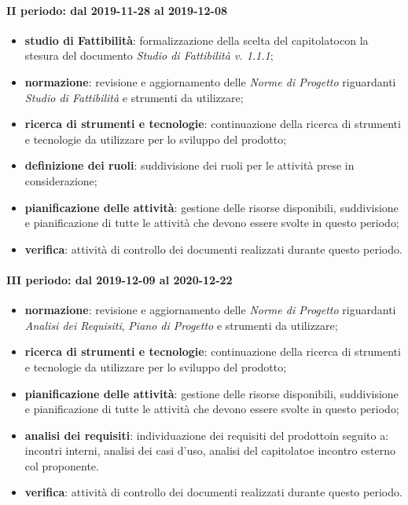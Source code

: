 \paragraph*{II periodo: dal 2019-11-28 al 2019-12-08}
\begin{itemize}
	\item \textbf{studio di Fattibilità}: formalizzazione della scelta del capitolato\glosp con la stesura del documento \textit{Studio di Fattibilità v. 1.1.1};
	\item \textbf{normazione}: revisione e aggiornamento delle \textit{Norme di Progetto} riguardanti \textit{Studio di Fattibilità} e strumenti da utilizzare;
	\item \textbf{ricerca di strumenti e tecnologie}: continuazione della ricerca di strumenti e tecnologie da utilizzare per lo sviluppo del prodotto\glo;
	\item \textbf{definizione dei ruoli}: suddivisione dei ruoli per le attività prese in considerazione; 
	\item \textbf{pianificazione delle attività}: gestione delle risorse disponibili, suddivisione e pianificazione di tutte le attività che devono essere svolte in questo periodo;
	\item \textbf{verifica}: attività di controllo dei documenti realizzati durante questo periodo.
\end{itemize}

\paragraph*{III periodo: dal 2019-12-09 al 2020-12-22}
\begin{itemize}
	\item \textbf{normazione}: revisione e aggiornamento delle \textit{Norme di Progetto} riguardanti \textit{Analisi dei Requisiti}, \textit{Piano di Progetto} e strumenti da utilizzare;
	\item \textbf{ricerca di strumenti e tecnologie}: continuazione della ricerca di strumenti e tecnologie da utilizzare per lo sviluppo del prodotto\glo;
	\item \textbf{pianificazione delle attività}: gestione delle risorse disponibili, suddivisione e pianificazione di tutte le attività che devono essere svolte in questo periodo;
	\item \textbf{analisi dei requisiti}: individuazione dei requisiti del prodotto\glosp in seguito a: incontri interni, analisi dei casi d'uso\glo, analisi del capitolato\glosp e incontro esterno col proponente.
	\item \textbf{verifica}: attività di controllo dei documenti realizzati durante questo periodo.
\end{itemize}

